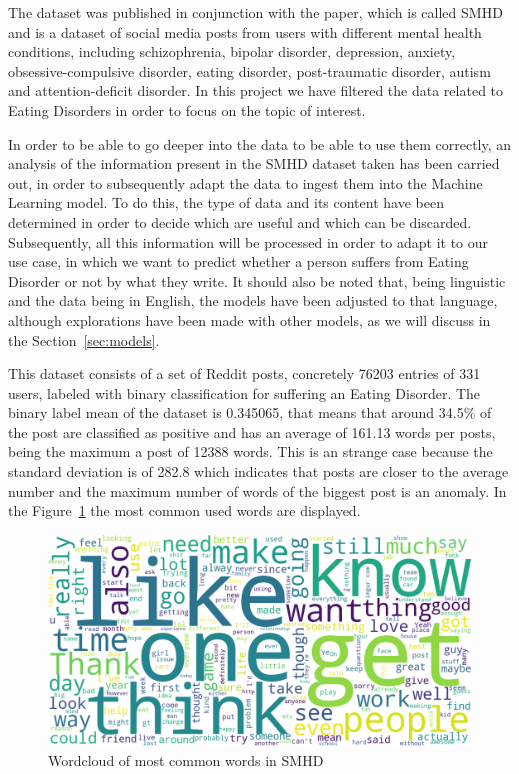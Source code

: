 The dataset was published in conjunction with the paper, which is called SMHD and is a dataset of social media posts from users with different mental health conditions, including schizophrenia, bipolar disorder, depression, anxiety, obsessive-compulsive disorder, eating disorder, post-traumatic disorder, autism and attention-deficit disorder. In this project we have filtered the data related to Eating Disorders in order to focus on the topic of interest.



In order to be able to go deeper into the data to be able to use them correctly, an analysis of the information present in the SMHD dataset taken has been carried out, in order to subsequently adapt the data to ingest them into the Machine Learning model. To do this, the type of data and its content have been determined in order to decide which are useful and which can be discarded. Subsequently, all this information will be processed in order to adapt it to our use case, in which we want to predict whether a person suffers from Eating Disorder or not by what they write. It should also be noted that, being linguistic and the data being in English, the models have been adjusted to that language, although explorations have been made with other models, as we will discuss in the Section~\ref{sec:models}.

This dataset consists of a set of Reddit posts, concretely 76203 entries of 331 users, labeled with binary classification for suffering an Eating Disorder. The binary label mean of the dataset is 0.345065, that means that around 34.5\% of the post are classified as positive and has an average of 161.13 words per posts, being the maximum a post of 12388 words. This is an strange case because the standard deviation is of 282.8 which indicates that posts are closer to the average number and the maximum number of words of the biggest post is an anomaly. In the Figure~\ref{fig:SMHDwordcloud} the most common used words are displayed.

\begin{figure}[!htp]
    \centering
    \includegraphics[scale=0.35]{img/detection/SMHD_wordcloud.png}
    \caption{Wordcloud of most common words in SMHD}
    \label{fig:SMHDwordcloud}
\end{figure}


